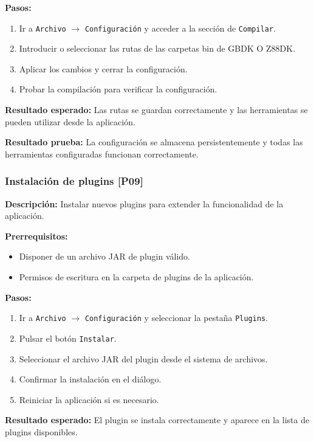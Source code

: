 \documentclass[../../main.tex]{subfiles}
\begin{document}
\textbf{Pasos:}
\begin{enumerate}
\item Ir a \lstinline|Archivo| $\rightarrow$ \lstinline|Configuración| y acceder a la sección de \lstinline|Compilar|.
\item Introducir o seleccionar las rutas de las carpetas bin de GBDK O Z88DK.
\item Aplicar los cambios y cerrar la configuración.
\item Probar la compilación para verificar la configuración.
\end{enumerate}

\textbf{Resultado esperado:} Las rutas se guardan correctamente y las herramientas se pueden utilizar desde la aplicación.

\textbf{Resultado prueba:} La configuración se almacena persistentemente y todas las herramientas configuradas funcionan correctamente.




\subsubsection{Instalación de plugins [P09]}

\textbf{Descripción:} Instalar nuevos plugins para extender la funcionalidad de la aplicación.

\textbf{Prerrequisitos:} 
\begin{itemize}
\item Disponer de un archivo JAR de plugin válido.
\item Permisos de escritura en la carpeta de plugins de la aplicación.
\end{itemize}

\textbf{Pasos:}
\begin{enumerate}
\item Ir a \lstinline|Archivo| $\rightarrow$ \lstinline|Configuración| y seleccionar la pestaña \lstinline|Plugins|.
\item Pulsar el botón \lstinline|Instalar|.
\item Seleccionar el archivo JAR del plugin desde el sistema de archivos.
\item Confirmar la instalación en el diálogo.
\item Reiniciar la aplicación si es necesario.
\end{enumerate}

\textbf{Resultado esperado:} El plugin se instala correctamente y aparece en la lista de plugins disponibles.
\end{document}
